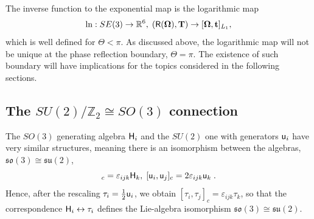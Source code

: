 \documentclass[conference]{IEEEtran}
\newcommand{\real}{\Bbb R}
\newcommand{\bfOmega}{\boldsymbol{\Omega}}
\newcommand{\beq}{\begin{equation}}
\newcommand{\eeq}{\end{equation}}
\begin{document}
\begin{appendix}
The inverse function to the exponential map is the logarithmic map
\beq
    \ln: SE(3)\rightarrow\real^6,\; ({\sf R}(\bfOmega),{\bf T})\rightarrow [\bfOmega,{\bf t}]_{L_1},
    \label{eq:logarithmicmap}
\eeq
which is well defined for $\Theta<\pi$. As discussed above, the logarithmic map will not be
unique at the phase reflection boundary, $\Theta = \pi$. The existence of such boundary will have
implications for the topics considered in the following sections.

\subsection{The $SU(2)/\mathbb{Z}_2 \cong SO(3)$ connection}
\label{app:su2so3}
The $SO(3)$ generating algebra ${\sf H}_i$ and the $SU(2)$ one with generators ${\sf u}_i$
have very similar structures,
meaning there is an isomorphism between the algebras, $\mathfrak{so}(3) \cong \mathfrak{su}(2)$,
\beq
      [{\sf H}_i,{\sf H}_j]_c = \varepsilon_{ijk}{\sf H}_k,\;
      [{\sf u}_i,{\sf u}_j]_c = 2\varepsilon_{ijk}{\sf u}_k\;. \label{eq:su2-algebra-structure}
\eeq
Hence, after the rescaling $\tau_i = \tfrac{1}{2}{\sf u}_i$, we obtain
$[\tau_i,\tau_j]_c = \varepsilon_{ijk}\tau_k$, so that the correspondence
${\sf H}_i \leftrightarrow \tau_i$ defines the Lie-algebra isomorphism
$\mathfrak{so}(3) \cong \mathfrak{su}(2)$.


\end{appendix}
\end{document}
